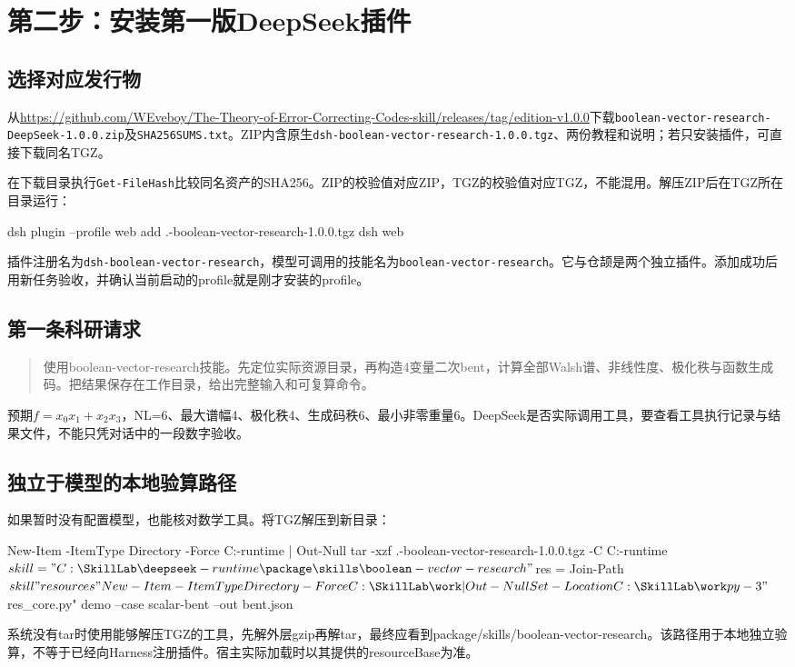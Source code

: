 \documentclass[UTF8,fontset=fandol,zihao=-4]{ctexrep}
\begin{document}
\chapter{第二步：安装第一版DeepSeek插件}
\section{选择对应发行物}
从\url{https://github.com/WEveboy/The-Theory-of-Error-Correcting-Codes-skill/releases/tag/edition-v1.0.0}下载\texttt{boolean-vector-research-DeepSeek-1.0.0.zip}及\texttt{SHA256SUMS.txt}。ZIP内含原生\texttt{dsh-boolean-vector-research-1.0.0.tgz}、两份教程和说明；若只安装插件，可直接下载同名TGZ。

在下载目录执行\texttt{Get-FileHash}比较同名资产的SHA256。ZIP的校验值对应ZIP，TGZ的校验值对应TGZ，不能混用。解压ZIP后在TGZ所在目录运行：
\begin{code}
dsh plugin --profile web add .\dsh-boolean-vector-research-1.0.0.tgz
dsh web
\end{code}
插件注册名为\texttt{dsh-boolean-vector-research}，模型可调用的技能名为\texttt{boolean-vector-research}。它与仓颉是两个独立插件。添加成功后用新任务验收，并确认当前启动的profile就是刚才安装的profile。

\section{第一条科研请求}
\begin{quote}
使用boolean-vector-research技能。先定位实际资源目录，再构造4变量二次bent，计算全部Walsh谱、非线性度、极化秩与函数生成码。把结果保存在工作目录，给出完整输入和可复算命令。
\end{quote}
预期$f=x_0x_1+x_2x_3$，NL=6、最大谱幅4、极化秩4、生成码秩6、最小非零重量6。DeepSeek是否实际调用工具，要查看工具执行记录与结果文件，不能只凭对话中的一段数字验收。

\section{独立于模型的本地验算路径}
如果暂时没有配置模型，也能核对数学工具。将TGZ解压到新目录：
\begin{code}
New-Item -ItemType Directory -Force C:\SkillLab\deepseek-runtime | Out-Null
tar -xzf .\dsh-boolean-vector-research-1.0.0.tgz -C C:\SkillLab\deepseek-runtime
$skill = "C:\SkillLab\deepseek-runtime\package\skills\boolean-vector-research"
$res = Join-Path $skill "resources"
New-Item -ItemType Directory -Force C:\SkillLab\work | Out-Null
Set-Location C:\SkillLab\work
py -3 "$res\research_core.py" demo --case scalar-bent --out bent.json
\end{code}
系统没有tar时使用能够解压TGZ的工具，先解外层gzip再解tar，最终应看到package/skills/boolean-vector-research。该路径用于本地独立验算，不等于已经向Harness注册插件。宿主实际加载时以其提供的resourceBase为准。
\end{document}
